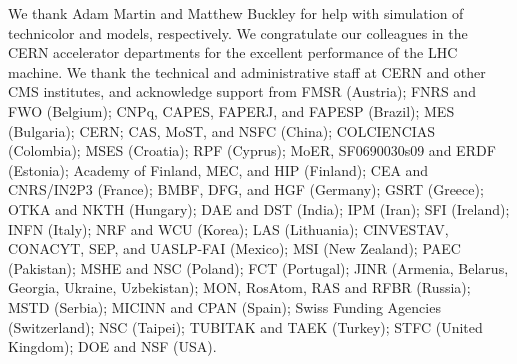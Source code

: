We thank Adam Martin and Matthew Buckley for help with simulation of
technicolor and \zp models, respectively.  We congratulate our
colleagues in the CERN accelerator departments for the excellent
performance of the LHC machine. We thank the technical and
administrative staff at CERN and other CMS institutes, and acknowledge
support from FMSR (Austria); FNRS and FWO (Belgium); CNPq, CAPES,
FAPERJ, and FAPESP (Brazil); MES (Bulgaria); CERN; CAS, MoST, and NSFC
(China); COLCIENCIAS (Colombia); MSES (Croatia); RPF (Cyprus); MoER,
SF0690030s09 and ERDF (Estonia); Academy of Finland, MEC, and HIP
(Finland); CEA and CNRS/IN2P3 (France); BMBF, DFG, and HGF (Germany);
GSRT (Greece); OTKA and NKTH (Hungary); DAE and DST (India); IPM
(Iran); SFI (Ireland); INFN (Italy); NRF and WCU (Korea); LAS
(Lithuania); CINVESTAV, CONACYT, SEP, and UASLP-FAI (Mexico); MSI (New
Zealand); PAEC (Pakistan); MSHE and NSC (Poland); FCT (Portugal); JINR
(Armenia, Belarus, Georgia, Ukraine, Uzbekistan); MON, RosAtom, RAS
and RFBR (Russia); MSTD (Serbia); MICINN and CPAN (Spain); Swiss
Funding Agencies (Switzerland); NSC (Taipei); TUBITAK and TAEK
(Turkey); STFC (United Kingdom); DOE and NSF (USA).

